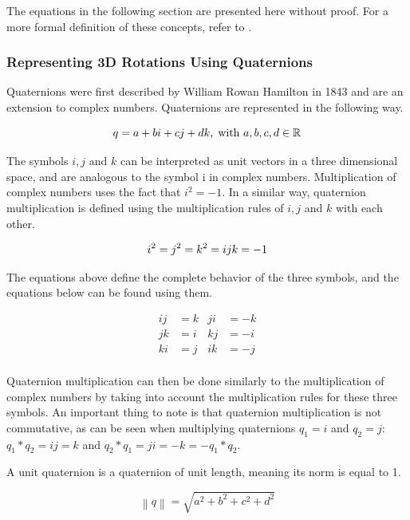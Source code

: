 The equations in the following section are presented here without proof. For a more formal definition of these concepts, refer to \cite{quaternions}.

\subsubsection{Representing 3D Rotations Using Quaternions}

Quaternions were first described by William Rowan Hamilton in 1843 and are an extension to complex numbers. Quaternions are represented in the following way.

\begin{equation}
    q = a + bi + cj + dk, \; \text{with } a, b, c, d \in \mathbb{R} \\
\end{equation}

The symbols \( i, j \) and \( k \) can be interpreted as unit vectors in a three dimensional space, and are analogous to the symbol i in complex numbers. Multiplication of complex numbers uses the fact that \( i^2 = -1 \). In a similar way, quaternion multiplication is defined using the multiplication rules of \( i, j \) and \( k \) with each other.

\begin{equation}
    i^2 = j^2 = k^2 = ijk = -1 \\
\end{equation}

The equations above define the complete behavior of the three symbols, and the equations below can be found using them.

\begin{align*}
    ij &= k & ji &= -k \\
    jk &= i & kj &= -i \\
    ki &= j & ik &= -j \\
\end{align*}

Quaternion multiplication can then be done similarly to the multiplication of complex numbers by taking into account the multiplication rules for these three symbols. An important thing to note is that quaternion multiplication is not commutative, as can be seen when multiplying quaternions \( q_1 = i \) and \( q_2 = j \): \( q_1*q_2 = ij = k \) and \( q_2*q_1 = ji = -k = -q_1*q_2 \). 

A unit quaternion is a quaternion of unit length, meaning its norm is equal to 1. 

\begin{equation}
    \left \| q \right \| = \sqrt{a^2 + b^2 + c^2 + d^2}
\end{equation}

